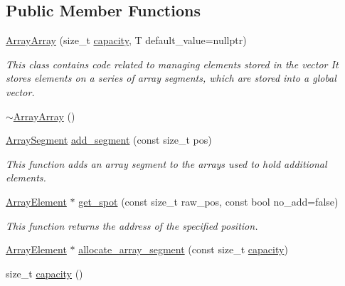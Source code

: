 \subsection*{Public Member Functions}
\begin{DoxyCompactItemize}
\item 
\hyperlink{classtervel_1_1containers_1_1wf_1_1vector_1_1_array_array_a4d5831877440072dac89334eda24e6e3}{Array\+Array} (size\+\_\+t \hyperlink{classtervel_1_1containers_1_1wf_1_1vector_1_1_array_array_ae7bb842a55e3e189dc1452fb077d8459}{capacity}, T default\+\_\+value=nullptr)
\begin{DoxyCompactList}\small\item\em This class contains code related to managing elements stored in the vector It stores elements on a series of array segments, which are stored into a global vector. \end{DoxyCompactList}\item 
\hyperlink{classtervel_1_1containers_1_1wf_1_1vector_1_1_array_array_a6bac363e501d15644d71e1057db51d55}{$\sim$\+Array\+Array} ()
\item 
\hyperlink{classtervel_1_1containers_1_1wf_1_1vector_1_1_array_array_a7c46cf8d5a4df86d5d258f5e97069876}{Array\+Segment} \hyperlink{classtervel_1_1containers_1_1wf_1_1vector_1_1_array_array_a26bfbe1d092f02ca047d24856cff004c}{add\+\_\+segment} (const size\+\_\+t pos)
\begin{DoxyCompactList}\small\item\em This function adds an array segment to the arrays used to hold additional elements. \end{DoxyCompactList}\item 
\hyperlink{classtervel_1_1containers_1_1wf_1_1vector_1_1_array_array_ac3a7367d6f8ead5417cafe0026e86481}{Array\+Element} $\ast$ \hyperlink{classtervel_1_1containers_1_1wf_1_1vector_1_1_array_array_afaa4f7502ab5ae8ccbe7bb05408f600a}{get\+\_\+spot} (const size\+\_\+t raw\+\_\+pos, const bool no\+\_\+add=false)
\begin{DoxyCompactList}\small\item\em This function returns the address of the specified position. \end{DoxyCompactList}\item 
\hyperlink{classtervel_1_1containers_1_1wf_1_1vector_1_1_array_array_ac3a7367d6f8ead5417cafe0026e86481}{Array\+Element} $\ast$ \hyperlink{classtervel_1_1containers_1_1wf_1_1vector_1_1_array_array_adeae4be5c2a2f99478a8afab5d033316}{allocate\+\_\+array\+\_\+segment} (const size\+\_\+t \hyperlink{classtervel_1_1containers_1_1wf_1_1vector_1_1_array_array_ae7bb842a55e3e189dc1452fb077d8459}{capacity})
\item 
size\+\_\+t \hyperlink{classtervel_1_1containers_1_1wf_1_1vector_1_1_array_array_ae7bb842a55e3e189dc1452fb077d8459}{capacity} ()
\end{DoxyCompactItemize}
